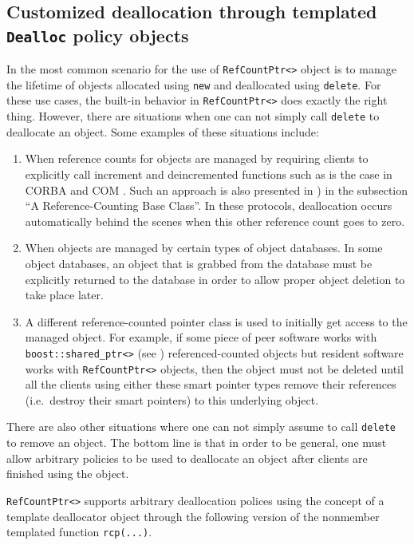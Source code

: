 %
\subsection{Customized deallocation through templated {}\texttt{Dealloc} policy objects}
\label{rcp:sec:dealloc}
%

In the most common scenario for the use of {}\texttt{RefCountPtr<>}
object is to manage the lifetime of objects allocated using
{}\texttt{new} and deallocated using {}\texttt{delete}.  For these use
cases, the built-in behavior in {}\texttt{RefCountPtr<>} does exactly
the right thing.  However, there are situations when one can not
simply call {}\texttt{delete} to deallocate an object.  Some examples
of these situations include:
%
\begin{enumerate}
\item
When reference counts for objects are managed by requiring clients to
explicitly call increment and deincremented functions such as is the case
in CORBA {}\cite{ref:corba} and COM {}\cite{ref:com}.  Such an
approach is also presented in {}\cite[Item 29]{ref:meyers_1996}) in
the subsection ``A Reference-Counting Base Class''.  In these
protocols, deallocation occurs automatically behind the scenes when
this other reference count goes to zero.
\item
When objects are managed by certain types of object databases.  In
some object databases, an object that is grabbed from the database must
be explicitly returned to the database in order to allow proper object
deletion to take place later.
\item
A different reference-counted pointer class is used to initially get
access to the managed object.  For example, if some piece of peer
software works with {}\texttt{boost::shared\_ptr<>} (see
{}\cite{ref:boost}) referenced-counted objects but resident software
works with {}\texttt{RefCountPtr<>} objects, then the object must not
be deleted until all the clients using either these smart pointer
types remove their references (i.e.~destroy their smart pointers) to
this underlying object.
\end{enumerate}
%
There are also other situations where one can not simply assume to call
{}\texttt{delete} to remove an object.  The bottom line is that in order
to be general, one must allow arbitrary policies to be used to
deallocate an object after clients are finished using the object.

{}\texttt{RefCountPtr<>} supports arbitrary deallocation polices using
the concept of a template deallocator object through the following
version of the nonmember templated function {}\texttt{rcp(...)}.

